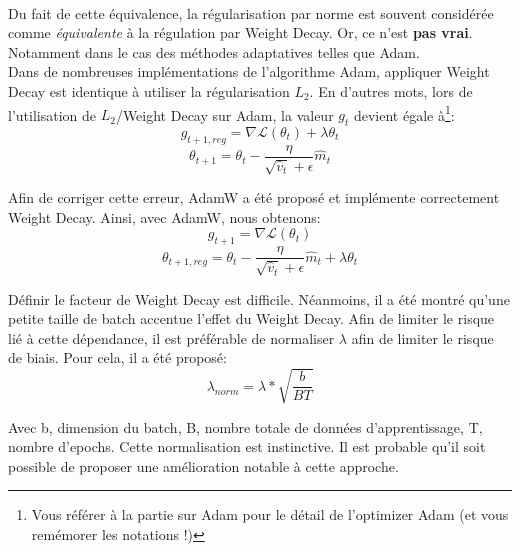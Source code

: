 \\

\noindent Du fait de cette équivalence, la régularisation par norme est souvent considérée  comme \textit{équivalente} à la régulation par Weight Decay. Or, ce n'est \textbf{pas vrai}. Notamment dans le cas des méthodes adaptatives telles que Adam.\\

\noindent Dans de nombreuses implémentations de l'algorithme Adam, appliquer Weight Decay est identique à utiliser la régularisation $L_2$. En d'autres mots, lors de l'utilisation de $L_2$/Weight Decay sur Adam, la valeur $g_t$ devient égale à\footnote{Vous référer à la partie sur Adam pour le détail de l'optimizer Adam (et vous remémorer les notations !)}:
$$g_{t+1,reg}=\nabla \mathcal{L}(\theta_{t})+\lambda \theta_t$$
$$\theta_{t+1} = \theta_{t} - \dfrac{\eta}{\sqrt{\hat{v}_t} + \epsilon} \hat{m}_t$$

\noindent Afin de corriger cette erreur, AdamW\cite{adamw} a été proposé et implémente correctement Weight Decay. Ainsi, avec AdamW, nous obtenons:
$$g_{t+1}=\nabla \mathcal{L}(\theta_{t})$$
$$\theta_{t+1,reg} = \theta_{t} - \dfrac{\eta}{\sqrt{\hat{v}_t} + \epsilon} \hat{m}_t + \lambda \theta_{t}$$

\noindent Définir le facteur de Weight Decay est difficile. Néanmoins, il a été montré qu'une petite taille de batch accentue l'effet du Weight Decay. Afin de limiter le risque lié à cette dépendance, il est préférable de normaliser $\lambda$ afin de limiter le risque de biais. Pour cela, il a été proposé:
$$\lambda_{norm}=\lambda*\sqrt{\frac{b}{BT}}$$

\noindent Avec b, dimension du batch, B, nombre  totale de données d'apprentissage, T, nombre d'epochs. Cette normalisation est instinctive. Il est probable qu'il soit possible de proposer une amélioration notable à cette approche.\\

